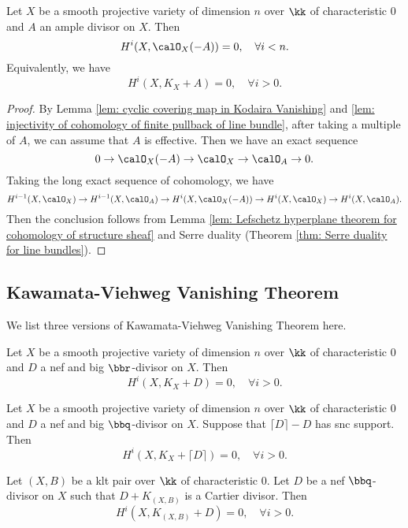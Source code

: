     \begin{theorem}\label{thm: Kodaira Vanishing Theorem}
        Let \(X\) be a smooth projective variety of dimension \(n\) over \(\kk\) of characteristic \(0\) and \(A\) an ample divisor on \(X\). 
        Then
        \[
            H^i(X, \calO_X(-A)) = 0,\quad \forall i < n.
        \]
        Equivalently, we have
        \[
            H^i(X, K_X + A) = 0,\quad \forall i > 0.
        \]
    \end{theorem}
    \begin{proof}
        By Lemma \ref{lem: cyclic covering map in Kodaira Vanishing} and \ref{lem: injectivity of cohomology of finite pullback of line bundle}, after taking a multiple of \(A\), we can assume that \(A\) is effective.
        Then we have an exact sequence
        \[ 0 \to \calO_X(-A) \to \calO_X \to \calO_A \to 0. \]
        Taking the long exact sequence of cohomology, we have
        \[ H^{i-1}(X,\calO_X) \to H^{i-1}(X, \calO_A) \to H^{i}(X, \calO_X(-A)) \to H^{i}(X, \calO_X) \to H^{i}(X, \calO_A). \]
        Then the conclusion follows from Lemma \ref{lem: Lefschetz hyperplane theorem for cohomology of structure sheaf} and Serre duality (Theorem \ref{thm: Serre duality for line bundles}).
    \end{proof}


\subsection{Kawamata-Viehweg Vanishing Theorem}

    We list three versions of Kawamata-Viehweg Vanishing Theorem here.

    \begin{theorem}\label{thm: Kawamata-Viehweg Vanishing Theorem for nef and big divisor}
        Let \(X\) be a smooth projective variety of dimension \(n\) over \(\kk\) of characteristic \(0\) and \(D\) a nef and big \(\bbr\)-divisor on \(X\).
        Then 
        \[ H^i(X, K_X + D) = 0,\quad \forall i > 0. \]
    \end{theorem}
    \begin{theorem}\label{thm: Kawamata-Viehweg Vanishing Theorem in KM98}
        Let \(X\) be a smooth projective variety of dimension \(n\) over \(\kk\) of characteristic \(0\) and \(D\) a nef and big \(\bbq\)-divisor on \(X\).
        Suppose that \(\lceil D \rceil - D\) has snc support.
        Then
        \[
            H^i(X, K_X + \lceil D \rceil) = 0,\quad \forall i > 0.
        \]
    \end{theorem}
    \begin{theorem}\label{thm: Kawamata-Viehweg Vanishing Theorem for klt pair}
        Let \((X,B)\) be a klt pair over \(\kk\) of characteristic \(0\).
        Let \(D\) be a nef \(\bbq\)-divisor on \(X\) such that \(D + K_{(X,B)}\) is a Cartier divisor.
        Then
        \[ H^i(X, K_{(X,B)} + D) = 0,\quad \forall i > 0. \]
    \end{theorem}

